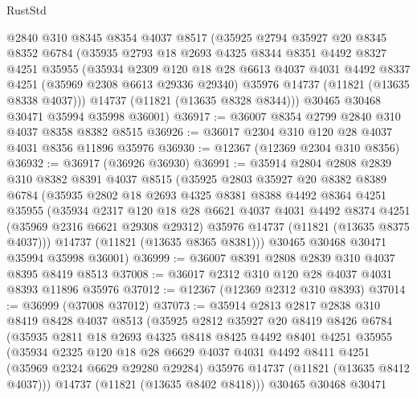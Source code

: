 \begin{lexlean}{RustStd}
\begin{coremodule}
    @2840
    @310
    @8345
    @8354
    @4037
    @8517
    (@35925
      @2794
      @35927
      @20
      @8345
      @8352
      @6784
      (@35935
        @2793
        @18
        @2693
        @4325
        @8344
        @8351
        @4492
        @8327
        @4251
        @35955
        (@35934
          @2309
          @120
          @18
          @28
          @6613
          @4037
          @4031
          @4492
          @8337
          @4251
          (@35969 @2308 @6613 @29336 @29340)
          @35976
          @14737
          (@11821 (@13635 @8338 @4037)))
        @14737
        (@11821 (@13635 @8328 @8344)))
      @30465
      @30468
      @30471
      @35994
      @35998
      @36001)
@36917 := @36007 @8354 @2799 @2840 @310 @4037 @8358 @8382 @8515
@36926 := @36017 @2304 @310 @120 @28 @4037 @4031 @8356 @11896 @35976
@36930 := @12367 (@12369 @2304 @310 @8356)
@36932 := @36917 (@36926 @36930)
@36991 := @35914
    @2804
    @2808
    @2839
    @310
    @8382
    @8391
    @4037
    @8515
    (@35925
      @2803
      @35927
      @20
      @8382
      @8389
      @6784
      (@35935
        @2802
        @18
        @2693
        @4325
        @8381
        @8388
        @4492
        @8364
        @4251
        @35955
        (@35934
          @2317
          @120
          @18
          @28
          @6621
          @4037
          @4031
          @4492
          @8374
          @4251
          (@35969 @2316 @6621 @29308 @29312)
          @35976
          @14737
          (@11821 (@13635 @8375 @4037)))
        @14737
        (@11821 (@13635 @8365 @8381)))
      @30465
      @30468
      @30471
      @35994
      @35998
      @36001)
@36999 := @36007 @8391 @2808 @2839 @310 @4037 @8395 @8419 @8513
@37008 := @36017 @2312 @310 @120 @28 @4037 @4031 @8393 @11896 @35976
@37012 := @12367 (@12369 @2312 @310 @8393)
@37014 := @36999 (@37008 @37012)
@37073 := @35914
    @2813
    @2817
    @2838
    @310
    @8419
    @8428
    @4037
    @8513
    (@35925
      @2812
      @35927
      @20
      @8419
      @8426
      @6784
      (@35935
        @2811
        @18
        @2693
        @4325
        @8418
        @8425
        @4492
        @8401
        @4251
        @35955
        (@35934
          @2325
          @120
          @18
          @28
          @6629
          @4037
          @4031
          @4492
          @8411
          @4251
          (@35969 @2324 @6629 @29280 @29284)
          @35976
          @14737
          (@11821 (@13635 @8412 @4037)))
        @14737
        (@11821 (@13635 @8402 @8418)))
      @30465
      @30468
      @30471

\end{coremodule}
\end{lexlean}
